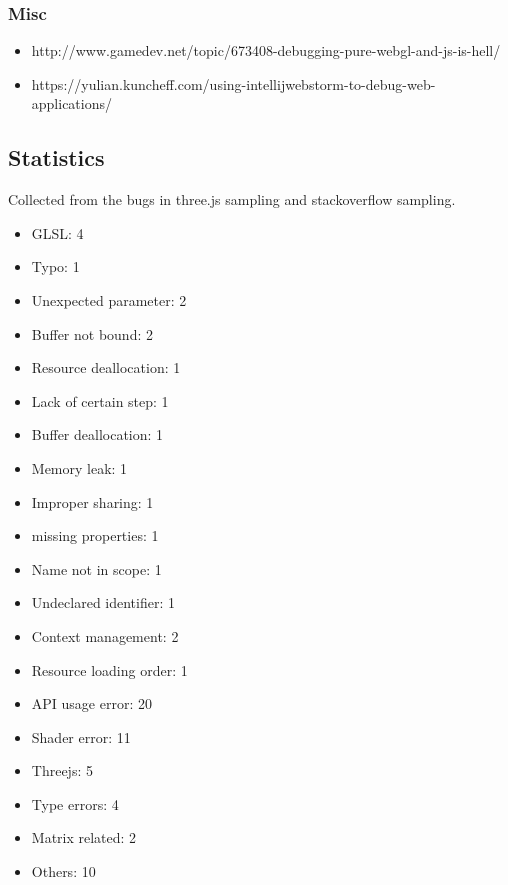 \documentclass[]{article}
\begin{document}
\subsubsection{Misc}\label{misc-1}

\begin{itemize}
\itemsep1pt\parskip0pt
\item
  http://www.gamedev.net/topic/673408-debugging-pure-webgl-and-js-is-hell/
\item
  https://yulian.kuncheff.com/using-intellijwebstorm-to-debug-web-applications/
\end{itemize}

\subsection{Statistics}\label{statistics}

Collected from the bugs in three.js sampling and stackoverflow sampling.

\begin{itemize}
\itemsep1pt\parskip0pt
\item
  GLSL: 4
\item
  Typo: 1
\item
  Unexpected parameter: 2
\item
  Buffer not bound: 2
\item
  Resource deallocation: 1
\item
  Lack of certain step: 1
\item
  Buffer deallocation: 1
\item
  Memory leak: 1
\item
  Improper sharing: 1
\item
  missing properties: 1
\item
  Name not in scope: 1
\item
  Undeclared identifier: 1
\item
  Context management: 2
\item
  Resource loading order: 1
\item
  API usage error: 20
\item
  Shader error: 11
\item
  Threejs: 5
\item
  Type errors: 4
\item
  Matrix related: 2
\item
  Others: 10
\end{itemize}
\end{document}
